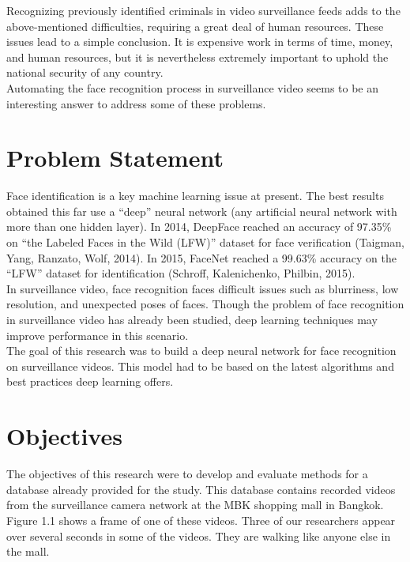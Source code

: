 Recognizing previously identified criminals in video surveillance feeds adds to the above-mentioned difficulties, requiring a great deal of human resources. These issues lead to a simple conclusion.  It is expensive work in terms of time, money, and human resources, but it is nevertheless extremely important to uphold the national security of any country.\\

Automating the face recognition process in surveillance video seems to be an interesting answer to address some of these problems.\\


\section{Problem Statement}

 Face identification is a key machine learning issue at present. The best results obtained this far use a \enquote{deep} neural network (any artificial neural network with more than one hidden layer). In 2014, DeepFace reached an accuracy of 97.35\% on \enquote{the Labeled Faces in the Wild (LFW)} dataset for face verification (Taigman, Yang, Ranzato, Wolf, 2014). In 2015, FaceNet reached a 99.63\% accuracy on the \enquote{LFW} dataset for identification (Schroff, Kalenichenko, Philbin, 2015).\\


In surveillance video, face recognition faces difficult issues such as blurriness, low resolution, and unexpected poses of faces. Though the problem of face recognition in surveillance video has already been studied, deep learning techniques may improve performance in this scenario.\\

The goal of this research was to build a deep neural network for face recognition on surveillance videos. This model had to be based on the latest algorithms and best practices deep learning offers.

\section{Objectives}

The objectives of this research were to develop and evaluate methods for a database already provided for the study. This database contains recorded videos from the surveillance camera network at the MBK shopping mall in Bangkok. Figure 1.1 shows a frame of one of these videos. Three of our researchers appear over several seconds in some of the videos. They are walking like anyone else in the mall.\\

